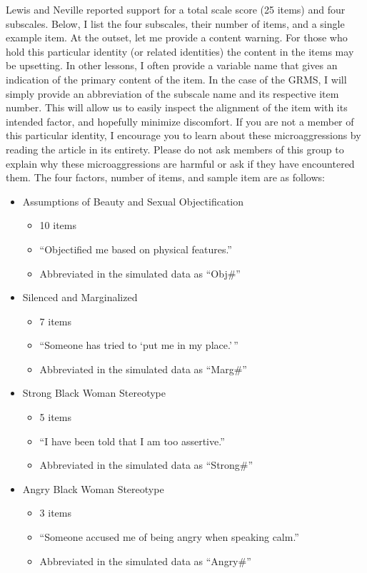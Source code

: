 \documentclass[
  english,
]{book}
\providecommand{\tightlist}{%
  \setlength{\itemsep}{0pt}\setlength{\parskip}{0pt}}
\begin{document}
Lewis and Neville \citeyearpar{lewis_construction_2015} reported support for a total scale score (25 items) and four subscales. Below, I list the four subscales, their number of items, and a single example item. At the outset, let me provide a content warning. For those who hold this particular identity (or related identities) the content in the items may be upsetting. In other lessons, I often provide a variable name that gives an indication of the primary content of the item. In the case of the GRMS, I will simply provide an abbreviation of the subscale name and its respective item number. This will allow us to easily inspect the alignment of the item with its intended factor, and hopefully minimize discomfort. If you are not a member of this particular identity, I encourage you to learn about these microaggressions by reading the article in its entirety. Please do not ask members of this group to explain why these microaggressions are harmful or ask if they have encountered them. The four factors, number of items, and sample item are as follows:

\begin{itemize}
\tightlist
\item
  Assumptions of Beauty and Sexual Objectification

  \begin{itemize}
  \tightlist
  \item
    10 items
  \item
    ``Objectified me based on physical features.''
  \item
    Abbreviated in the simulated data as ``Obj\#''
  \end{itemize}
\item
  Silenced and Marginalized

  \begin{itemize}
  \tightlist
  \item
    7 items
  \item
    ``Someone has tried to `put me in my place.'\,''
  \item
    Abbreviated in the simulated data as ``Marg\#''
  \end{itemize}
\item
  Strong Black Woman Stereotype

  \begin{itemize}
  \tightlist
  \item
    5 items
  \item
    ``I have been told that I am too assertive.''
  \item
    Abbreviated in the simulated data as ``Strong\#''
  \end{itemize}
\item
  Angry Black Woman Stereotype

  \begin{itemize}
  \tightlist
  \item
    3 items
  \item
    ``Someone accused me of being angry when speaking calm.''
  \item
    Abbreviated in the simulated data as ``Angry\#''
  \end{itemize}
\end{itemize}
\end{document}
